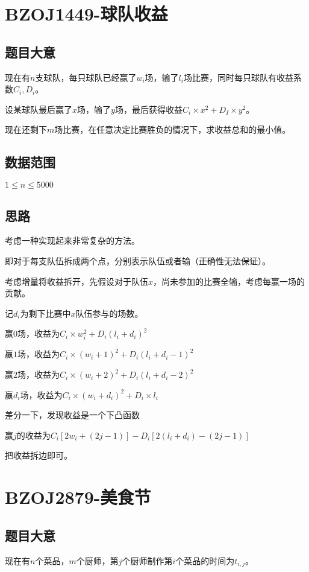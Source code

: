 \documentclass{ctexart}
\numberwithin{equation}{section}
\begin{document}
\begin{flushleft}
  \newpage

  \section{BZOJ1449-球队收益}
  \subsection{题目大意}
  现在有$n$支球队，每只球队已经赢了$w_i$场，输了$l_i$场比赛，同时每只球队有收益系数$C_i,D_i$。

  设某球队最后赢了$x$场，输了$y$场，最后获得收益$C_i\times x^2+D_I\times y^2$。

  现在还剩下$m$场比赛，在任意决定比赛胜负的情况下，求收益总和的最小值。

    
  \subsection{数据范围}
  $1\le n \le 5000$
  \subsection{思路}
  考虑一种实现起来非常复杂的方法。
  
  即对于每支队伍拆成两个点，分别表示队伍或者输（\sout{正确性无法保证}）。
  
  考虑增量将收益拆开，先假设对于队伍$x$，尚未参加的比赛全输，考虑每赢一场的贡献。

  记$d_i$为剩下比赛中$x$队伍参与的场数。
  
  赢$0$场，收益为$C_i\times w_i^2+D_i(l_i+d_i)^2$

  赢$1$场，收益为$C_i\times (w_i+1)^2+D_i(l_i+d_i-1)^2$

  赢$2$场，收益为$C_i\times (w_i+2)^2+D_i(l_i+d_i-2)^2$

  赢$d_i$场，收益为$C_i\times (w_i+d_i)^2+D_i\times l_i$

  差分一下，发现收益是一个下凸函数

  赢$j$的收益为$C_i[2w_i+(2j-1)]-D_i[2(l_i+d_i)-(2j-1)] $
  
  把收益拆边即可。
  
  \newpage

  \section{BZOJ2879-美食节}
  \subsection{题目大意}
  现在有$n$个菜品，$m$个厨师，第$j$个厨师制作第$i$个菜品的时间为$t_{i,j}$。


\end{flushleft}
\end{document}
